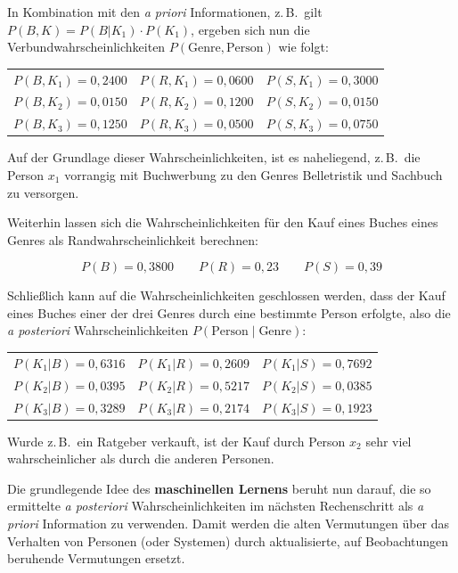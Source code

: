 \begin{beispiel}[Internetwerbung]
In Kombination mit den \textit{a priori} Informationen, z.\,B.\ gilt $P(B, K) = P(B|K_1) \cdot P(K_1)$, ergeben sich nun die Verbundwahrscheinlichkeiten $P(\text{Genre}, \text{Person})$ wie folgt:

\begin{center}
\begin{tabular}{lll}
  $P(B, K_1) = 0{,}2400$ & $P(R, K_1) = 0{,}0600$ & $P(S, K_1) = 0{,}3000$ \\
  $P(B, K_2) = 0{,}0150$ & $P(R, K_2) = 0{,}1200$ & $P(S, K_2) = 0{,}0150$ \\
  $P(B, K_3) = 0{,}1250$ & $P(R, K_3) = 0{,}0500$ & $P(S, K_3) = 0{,}0750$ \\
\end{tabular}
\end{center}

Auf der Grundlage dieser Wahrscheinlichkeiten, ist es naheliegend, z.\,B.\ die Person $x_1$ vorrangig mit Buchwerbung zu den Genres Belletristik und Sachbuch zu versorgen.

Weiterhin lassen sich die Wahrscheinlichkeiten für den Kauf eines Buches eines Genres als Randwahrscheinlichkeit berechnen:

$$
P(B) = 0{,}3800 \qquad P(R) = 0{,}23 \qquad P(S) = 0{,}39
$$

Schließlich kann auf die Wahrscheinlichkeiten geschlossen werden, dass der Kauf eines Buches einer der drei Genres durch eine bestimmte Person erfolgte, also die \textit{a posteriori} Wahrscheinlichkeiten $P(\text{Person} \mid \text{Genre})$:

\begin{center}
\begin{tabular}{lll}
  $P(K_1|B) = 0{,}6316$ & $P(K_1|R) = 0{,}2609$ & $P(K_1|S) = 0{,}7692$ \\
  $P(K_2|B) = 0{,}0395$ & $P(K_2|R) = 0{,}5217$ & $P(K_2|S) = 0{,}0385$ \\
  $P(K_3|B) = 0{,}3289$ & $P(K_3|R) = 0{,}2174$ & $P(K_3|S) = 0{,}1923$ \\
\end{tabular}
\end{center}

Wurde z.\,B.\ ein Ratgeber verkauft, ist der Kauf durch Person $x_2$ sehr viel wahrscheinlicher als durch die anderen Personen.

Die grundlegende Idee des \textbf{maschinellen Lernens} beruht nun darauf, die so ermittelte \textit{a posteriori} Wahrscheinlichkeiten im nächsten Rechenschritt als \textit{a priori} Information zu verwenden. Damit werden die alten Vermutungen über das Verhalten von Personen (oder Systemen) durch aktualisierte, auf Beobachtungen beruhende Vermutungen ersetzt.


\end{beispiel}
